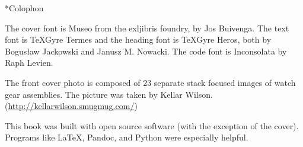 \begin{chapter}*{Colophon}

\noindent The cover font is Museo from the exljibris foundry, by Jos 
Buivenga.  The text font is \TeX Gyre Termes and the heading font is \TeX Gyre
Heros, both by Bogus\l{}aw Jackowski and Janusz M. Nowacki.  The code font is
Inconsolata by Raph Levien.

The front cover photo is composed of 23 separate stack focused images of watch
gear assemblies. The picture was taken by Kellar Wilson.
(\url{http://kellarwilson.smugmug.com/})

This book was built with open source software (with the exception of the
cover).  Programs like \LaTeX, Pandoc, and Python were especially helpful.

\end{chapter}

\pagebreak
\thispagestyle{empty}
\mbox{}

